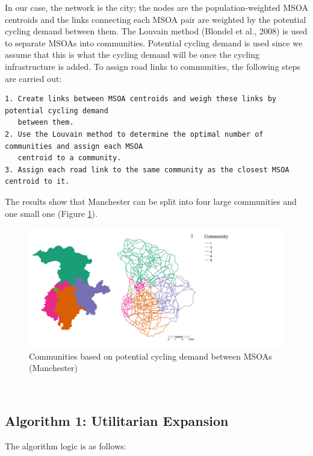 \documentclass[
]{article}
\begin{document}
In our case, the network is the city; the nodes are the
population-weighted MSOA centroids and the links connecting each MSOA
pair are weighted by the potential cycling demand between them. The
Louvain method (Blondel et al., 2008) is used to separate MSOAs into
communities. Potential cycling demand is used since we assume that this
is what the cycling demand will be once the cycling infrastructure is
added. To assign road links to communities, the following steps are
carried out:

\begin{verbatim}
1. Create links between MSOA centroids and weigh these links by potential cycling demand 
   between them.
2. Use the Louvain method to determine the optimal number of communities and assign each MSOA 
   centroid to a community.
3. Assign each road link to the same community as the closest MSOA centroid to it.
\end{verbatim}

The results show that Manchester can be split into four large
communities and one small one (Figure \ref{fig:communitiesmanchester}).

\begin{figure}

{\centering \includegraphics[width=0.8\linewidth]{data/Manchester/Plots/communities_alternative_Manchester} 

}

\caption{Communities based on potential cycling demand between MSOAs (Manchester)}\label{fig:communitiesmanchester}
\end{figure}

~

\hypertarget{algorithm-1-utilitarian-expansion}{%
\subsection{Algorithm 1: Utilitarian Expansion}\label{algorithm-1-utilitarian-expansion}}

The algorithm logic is as follows:
\end{document}
